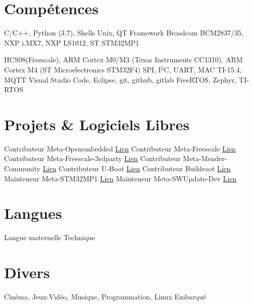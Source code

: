 \documentclass[9pts,a4paper,sans]{moderncv}
\begin{document}
\section{Compétences}
 {C/C++, Python (3.7), Shells Unix, QT Framework} 
 {Broadcom BCM2837/35, NXP i.MX7, NXP LS1012, ST STM32MP1}

 {HCS08(Freescale), ARM Cortex M0/M3 (Texas Instruments CC1310), ARM Cortex M4 (ST Microelectronics STM32F4)}
 {SPI, I$^{2}$C, UART, MAC TI-15.4, MQTT} 
 {Visual Studio Code, Eclipse, git, github, gitlab }
 {FreeRTOS, Zephyr, TI-RTOS}

\section{Projets \& Logiciels Libres}
\cventry{} {Contributeur} {Meta-Openembedded} {} {\href{https://github.com/openembedded/meta-openembedded/commits?author=jorisoffouga}{Lien}} {}
\cventry{} {Contributeur} {Meta-Freescale} {} {\href{https://github.com/Freescale/meta-freescale/commits?author=jorisoffouga}{Lien}} {}
\cventry{} {Contributeur} {Meta-Freescale-3rdparty} {} {\href{https://github.com/Freescale/meta-freescale-3rdparty/commits?author=jorisoffouga}{Lien}} {}
\cventry{} {Contributeur} {Meta-Mender-Community} {} {\href{https://github.com/mendersoftware/meta-mender-community/commits?author=jorisoffouga}{Lien}} {}
\cventry{} {Contributeur} {U-Boot} {} {\href{https://github.com/trini/u-boot/commits?author=jorisoffouga}{Lien}} {}
\cventry{} {Contributeur} {Buildroot} {} {\href{https://github.com/buildroot/buildroot/commits?author=jorisoffouga}{Lien}} {}
\cventry{} {Mainteneur} {Meta-STM32MP1} {} {\href{https://github.com/bdx-iot/meta-stm32mp1/commits?author=jorisoffouga}{Lien}} {}
\cventry{} {Mainteneur} {Meta-SWUpdate-Dev} {} {\href{https://github.com/bdx-iot/meta-swupdate-dev/commits?author=jorisoffouga}{Lien}} {}

\section{Langues}
 {Langue maternelle}
 {Technique}
 
\section{Divers}
 {Cinéma, Jeux-Vidéo, Musique, Programmation, Linux Embarqué}
\end{document}
